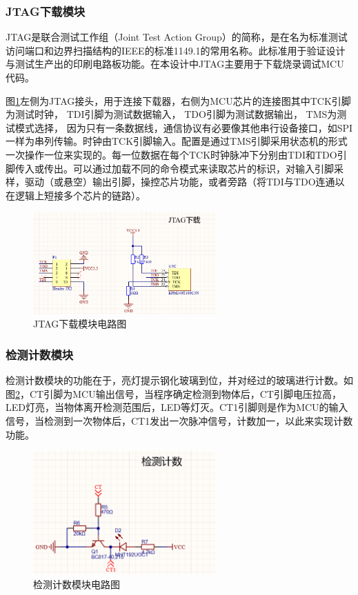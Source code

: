     \subsubsection{JTAG下载模块}
    JTAG是联合测试工作组（Joint Test Action Group）的简称，是在名为标准测试访问端口和边界扫描结构的IEEE的标准1149.1的常用名称。此标准用于验证设计与测试生产出的印刷电路板功能。在本设计中JTAG主要用于下载烧录调试MCU代码。\par
    图\ref{JTAG下载模块电路图}左侧为JTAG接头，用于连接下载器，右侧为MCU芯片的连接图其中TCK引脚为测试时钟，
    TDI引脚为测试数据输入，
TDO引脚为测试数据输出，
TMS为测试模式选择，
因为只有一条数据线，通信协议有必要像其他串行设备接口，如SPI一样为串列传输。时钟由TCK引脚输入。配置是通过TMS引脚采用状态机的形式一次操作一位来实现的。每一位数据在每个TCK时钟脉冲下分别由TDI和TDO引脚传入或传出。可以通过加载不同的命令模式来读取芯片的标识，对输入引脚采样，驱动（或悬空）输出引脚，操控芯片功能，或者旁路（将TDI与TDO连通以在逻辑上短接多个芯片的链路）。
    \begin{figure}[H]
        \centering
        \includegraphics[width=7cm]{figure/JTAG download circuit.png}
        \songti{}\caption{JTAG下载模块电路图}
        \label{JTAG下载模块电路图}
    \end{figure}
    
    \subsubsection{检测计数模块}
    检测计数模块的功能在于，亮灯提示钢化玻璃到位，并对经过的玻璃进行计数。如图\ref{检测计数模块电路图}，CT引脚为MCU输出信号，当程序确定检测到物体后，CT引脚电压拉高，LED灯亮，当物体离开检测范围后，LED等灯灭。CT1引脚则是作为MCU的输入信号，当检测到一次物体后，CT1发出一次脉冲信号，计数加一，以此来实现计数功能。
    \begin{figure}[H]
        \centering
        \includegraphics[width=7cm]{figure/detection count circuit.png}
        \songti{}\caption{检测计数模块电路图}
        \label{检测计数模块电路图}
    \end{figure}
    

